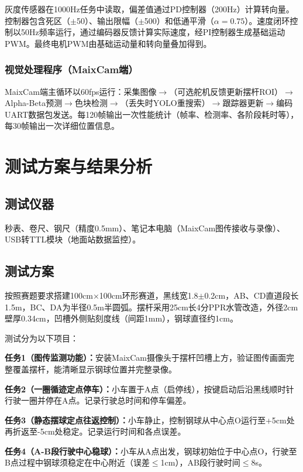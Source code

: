 \documentclass[12pt,a4paper]{ctexart}
\begin{document}
灰度传感器在1000Hz任务中读取，偏差值通过PD控制器（200Hz）计算转向量。控制器包含死区（$\pm$50）、输出限幅（$\pm$500）和低通平滑（$\alpha=0.75$）。速度闭环控制以50Hz频率运行，通过编码器反馈计算实际速度，经PI控制器生成基础运动PWM。最终电机PWM由基础运动量和转向量叠加得到。

\subsubsection{视觉处理程序（MaixCam端）}

MaixCam端主循环以60fps运行：采集图像$\to$（可选舵机反馈更新摆杆ROI）$\to$Alpha-Beta预测$\to$色块检测$\to$（丢失时YOLO重搜索）$\to$跟踪器更新$\to$编码UART数据包发送。每120帧输出一次性能统计（帧率、检测率、各阶段耗时等），每30帧输出一次详细位置信息。

\section{\textbf{测试方案与结果分析}}

\subsection{\textbf{测试仪器}}
秒表、卷尺、钢尺（精度0.5mm）、笔记本电脑（MaixCam图传接收与录像）、USB转TTL模块（地面站数据监控）。

\subsection{\textbf{测试方案}}

按照赛题要求搭建100cm×100cm环形赛道，黑线宽1.8$\pm$0.2cm，AB、CD直道段长1.5m，BC、DA为半径0.5m半圆弧。摆杆采用25cm长4分PPR水管改造，外径2cm壁厚0.34cm，凹槽外侧贴刻度线（间距1mm），钢球直径约1cm。

测试分为以下项目：

\textbf{任务1（图传监测功能）：}安装MaixCam摄像头于摆杆凹槽上方，验证图传画面完整覆盖摆杆，能清晰显示钢球位置并完整录像。

\textbf{任务2（一圈循迹定点停车）：}小车置于A点（启停线），按键启动后沿黑线顺时针行驶一圈并停在A点。记录行驶总时间和停车偏差。

\textbf{任务3（静态摆球定点往返控制）：}小车静止，控制钢球从中心点O运行至+5cm处再折返至-5cm处稳定。记录运行时间和各点误差。

\textbf{任务4（A-B段行驶中心稳球）：}小车从A点出发，钢球初始位于中心点O，行驶至B点过程中钢球须稳定在中心附近（误差$\leq$1cm），AB段行驶时间$\leq$8s。
\end{document}
